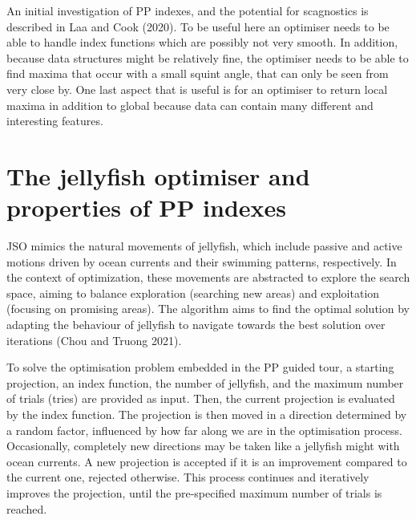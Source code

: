 \documentclass[
  12pt,
]{interact}
\theoremstyle{plain}
\begin{document}
An initial investigation of PP indexes, and the potential for
scagnostics is described in Laa and Cook (2020). To be useful here an
optimiser needs to be able to handle index functions which are possibly
not very smooth. In addition, because data structures might be
relatively fine, the optimiser needs to be able to find maxima that
occur with a small squint angle, that can only be seen from very close
by. One last aspect that is useful is for an optimiser to return local
maxima in addition to global because data can contain many different and
interesting features.

\hypertarget{sec-theory}{%
\section{The jellyfish optimiser and properties of PP
indexes}\label{sec-theory}}

JSO mimics the natural movements of jellyfish, which include passive and
active motions driven by ocean currents and their swimming patterns,
respectively. In the context of optimization, these movements are
abstracted to explore the search space, aiming to balance exploration
(searching new areas) and exploitation (focusing on promising areas).
The algorithm aims to find the optimal solution by adapting the
behaviour of jellyfish to navigate towards the best solution over
iterations (Chou and Truong 2021).

To solve the optimisation problem embedded in the PP guided tour, a
starting projection, an index function, the number of jellyfish, and the
maximum number of trials (tries) are provided as input. Then, the
current projection is evaluated by the index function. The projection is
then moved in a direction determined by a random factor, influenced by
how far along we are in the optimisation process. Occasionally,
completely new directions may be taken like a jellyfish might with ocean
currents. A new projection is accepted if it is an improvement compared
to the current one, rejected otherwise. This process continues and
iteratively improves the projection, until the pre-specified maximum
number of trials is reached.
\end{document}
